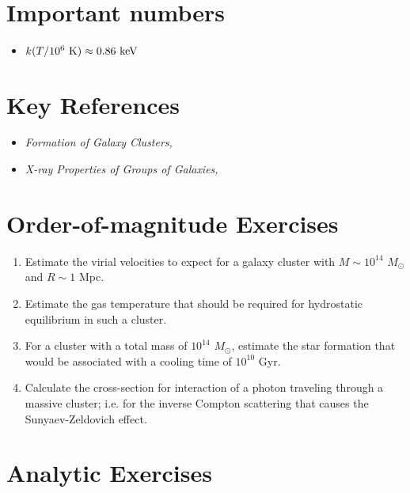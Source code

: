 \section{Important numbers}

\begin{itemize}
\item $k(T / 10^{6}{\rm ~K}) \approx 0.86 {\rm ~keV}$
\end{itemize}

\section{Key References}

\begin{itemize}
\item {\it Formation of Galaxy
Clusters, \href{https://ui.adsabs.harvard.edu/abs/2012ARA%26A..50..353K/abstract}{\citet{kravtsov12a}}}
\item {\it X-ray Properties of Groups of
Galaxies, \href{https://ui.adsabs.harvard.edu/abs/2000ARA%26A..38..289M/abstract}{\citet{mulchaey00a}}}
\end{itemize}

\section{Order-of-magnitude Exercises}

\begin{enumerate} 
\item Estimate the virial velocities to expect for a galaxy cluster
    with $M\sim 10^{14}$ $M_\odot$ and $R\sim 1$ Mpc.
\item Estimate the gas temperature that should be required for
hydrostatic equilibrium in such a cluster.
\item For a cluster with a total mass of $10^{14}$ $M_\odot$, estimate
    the star formation that would be associated with a cooling time of
    $10^{10}$ Gyr.
\item Calculate the cross-section for interaction of a photon
    traveling through a massive cluster; i.e. for the inverse Compton
    scattering that causes the Sunyaev-Zeldovich effect.
\end{enumerate}   

\section{Analytic Exercises}

